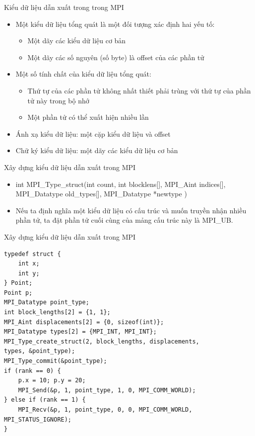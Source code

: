 \documentclass[10pt]{beamer}
\theoremstyle{remark}
\numberwithin{algocf}{section}
\numberwithin{equation}{section}
\numberwithin{dl}{section}
\numberwithin{figure}{section}
\begin{document}
\begin{frame}{Kiểu dữ liệu dẫn xuất trong trong MPI}
    \begin{itemize}
        \item Một kiểu dữ liệu tổng quát là một đối tượng xác định hai yếu tố:
        \begin{itemize}
            \item Một dãy các kiểu dữ liệu cơ bản 
            \item Một dãy các số nguyên (số byte) là offset của các phần tử
        \end{itemize}
        \item Một số tính chất của kiểu dữ liệu tổng quát:
        \begin{itemize}
            \item Thứ tự của các phần tử không nhất thiết phải trùng với thứ tự của phần tử này trong bộ nhớ
            \item Một phần tử có thể xuất hiện nhiều lần
        \end{itemize}
        \item Ánh xạ kiểu dữ liệu: một cặp kiểu dữ liệu và offset
        \item Chữ ký kiểu dữ liệu: một dãy các kiểu dữ liệu cơ bản
    \end{itemize}
\end{frame}

\begin{frame}{Xây dựng kiểu dữ liệu dẫn xuất trong MPI}
    \begin{itemize}
        \item int MPI\_Type\_struct(int count, int blocklens[],
                                    MPI\_Aint indices[], MPI\_Datatype old\_types[],
                                    MPI\_Datatype *newtype )
        \item Nếu ta định nghĩa một kiểu dữ liệu có cấu trúc và muốn truyền nhận nhiều phần tử, ta đặt phần tử cuối cùng của mảng cấu trúc này là MPI\_UB.
    \end{itemize}
\end{frame}

\begin{frame}{Xây dựng kiểu dữ liệu dẫn xuất trong MPI}
    \begin{verbatim}
typedef struct {
    int x;
    int y;
} Point;
Point p;
MPI_Datatype point_type;
int block_lengths[2] = {1, 1};
MPI_Aint displacements[2] = {0, sizeof(int)};
MPI_Datatype types[2] = {MPI_INT, MPI_INT};
MPI_Type_create_struct(2, block_lengths, displacements, 
types, &point_type);
MPI_Type_commit(&point_type);
if (rank == 0) {
    p.x = 10; p.y = 20;
    MPI_Send(&p, 1, point_type, 1, 0, MPI_COMM_WORLD);
} else if (rank == 1) {
    MPI_Recv(&p, 1, point_type, 0, 0, MPI_COMM_WORLD, MPI_STATUS_IGNORE);
}
    \end{verbatim}
\end{frame}
\end{document}
